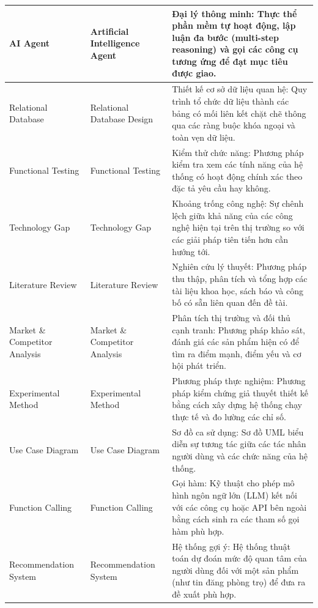 \begin{longtable}{|L{0.18\textwidth}|L{0.27\textwidth}|L{0.49\textwidth}|}
AI Agent & Artificial Intelligence Agent & Đại lý thông minh: Thực thể phần mềm tự hoạt động, lập luận đa bước (multi-step reasoning) và gọi các công cụ tương ứng để đạt mục tiêu được giao. \\
\hline

Relational Database & Relational Database Design & Thiết kế cơ sở dữ liệu quan hệ: Quy trình tổ chức dữ liệu thành các bảng có mối liên kết chặt chẽ thông qua các ràng buộc khóa ngoại và toàn vẹn dữ liệu. \\
\hline

Functional Testing & Functional Testing & Kiểm thử chức năng: Phương pháp kiểm tra xem các tính năng của hệ thống có hoạt động chính xác theo đặc tả yêu cầu hay không. \\
\hline

Technology Gap & Technology Gap & Khoảng trống công nghệ: Sự chênh lệch giữa khả năng của các công nghệ hiện tại trên thị trường so với các giải pháp tiên tiến hơn cần hướng tới. \\
\hline

Literature Review & Literature Review & Nghiên cứu lý thuyết: Phương pháp thu thập, phân tích và tổng hợp các tài liệu khoa học, sách báo và công bố có sẵn liên quan đến đề tài. \\
\hline

Market \& Competitor Analysis & Market \& Competitor Analysis & Phân tích thị trường và đối thủ cạnh tranh: Phương pháp khảo sát, đánh giá các sản phẩm hiện có để tìm ra điểm mạnh, điểm yếu và cơ hội phát triển. \\
\hline

Experimental Method & Experimental Method & Phương pháp thực nghiệm: Phương pháp kiểm chứng giả thuyết thiết kế bằng cách xây dựng hệ thống chạy thực tế và đo lường các chỉ số. \\
\hline

Use Case Diagram & Use Case Diagram & Sơ đồ ca sử dụng: Sơ đồ UML biểu diễn sự tương tác giữa các tác nhân người dùng và các chức năng của hệ thống. \\
\hline

Function Calling & Function Calling & Gọi hàm: Kỹ thuật cho phép mô hình ngôn ngữ lớn (LLM) kết nối với các công cụ hoặc API bên ngoài bằng cách sinh ra các tham số gọi hàm phù hợp. \\
\hline

Recommendation System & Recommendation System & Hệ thống gợi ý: Hệ thống thuật toán dự đoán mức độ quan tâm của người dùng đối với một sản phẩm (như tin đăng phòng trọ) để đưa ra đề xuất phù hợp. \\
\hline


\end{longtable}
